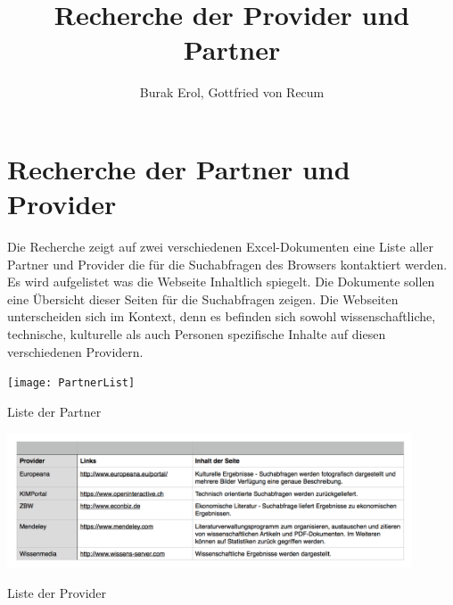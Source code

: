 
\title{Recherche der Provider und Partner}
\author{Burak Erol, Gottfried von Recum}


\chapter{Recherche der Partner und Provider}

Die Recherche zeigt auf zwei verschiedenen Excel-Dokumenten eine Liste aller Partner und Provider die für die Suchabfragen des Browsers kontaktiert werden. Es wird aufgelistet was die Webseite Inhaltlich spiegelt. Die Dokumente sollen eine Übersicht dieser Seiten für die Suchabfragen zeigen. Die Webseiten unterscheiden sich im Kontext, denn es befinden sich sowohl wissenschaftliche, technische, kulturelle als auch Personen spezifische Inhalte auf diesen verschiedenen Providern.

\begin{table}[h]
	\centering
	\texttt{[image: PartnerList]}
	\caption{Liste der Partner}
	\label{fig:Partner}
\end{table}

\begin{table}[h]
	\centering
	\includegraphics[width=12cm]{Pics/ProviderList}
	\caption{Liste der Provider}
	\label{fig:Provider}
\end{table}